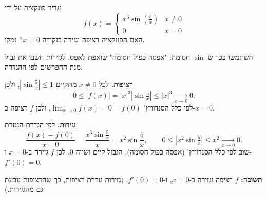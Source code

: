 
\begin{question}
נגדיר פונקציה על ידי
\[ f(x) = \begin{cases} x^3 \sin(\frac{5}{x}) & x \ne 0 \\ 0 & x = 0 \end{cases} \]
האם הפונקציה רציפה וגזירה בנקודה $x = 0$? נמקו.
\end{question}

\begin{hint}
השתמשו בכך ש-$\sin$ חסומה: "אפסה כפול חסומה" שואפת לאפס. לגזירות חשבו את גבול מנת ההפרשים לפי ההגדרה.
\end{hint}

\begin{solution}
\textbf{רציפות.} לכל $x \ne 0$ מתקיים $\left|\sin\frac{5}{x}\right| \le 1$, ולכן
\[ 0 \le |f(x)| = |x|^3\left|\sin\tfrac{5}{x}\right| \le |x|^3 \xrightarrow[x\to0]{} 0. \]
לפי כלל הסנדוויץ' $\lim_{x\to0} f(x) = 0 = f(0)$, ולכן $f$ רציפה ב-$x = 0$.

\textbf{גזירות.} לפי הגדרת הנגזרת:
\[ \frac{f(x) - f(0)}{x - 0} = \frac{x^3\sin\frac5x}{x} = x^2\sin\frac5x, \qquad 0 \le \left| x^2 \sin\tfrac5x \right| \le x^2 \xrightarrow[x\to0]{} 0. \]
שוב לפי כלל הסנדוויץ' (אפסה כפול חסומה), הגבול קיים ושווה $0$. לכן $f$ גזירה ב-$x = 0$ ו-$f'(0) = 0$.

\textbf{תשובה:} $f$ רציפה וגזירה ב-$x = 0$, ו-$f'(0) = 0$. (גזירות גוררת רציפות, כך שהרציפות נובעת גם מהגזירות.)
\end{solution}
